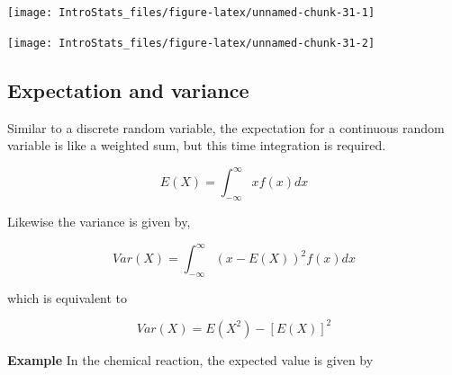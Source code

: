 \documentclass[
  oneside]{krantz}
\newenvironment{Shaded}{\begin{snugshade}}{\end{snugshade}}
\newcommand{\AttributeTok}[1]{\textcolor[rgb]{0.77,0.63,0.00}{#1}}
\newcommand{\CommentTok}[1]{\textcolor[rgb]{0.56,0.35,0.01}{\textit{#1}}}
\newcommand{\DecValTok}[1]{\textcolor[rgb]{0.00,0.00,0.81}{#1}}
\newcommand{\FunctionTok}[1]{\textcolor[rgb]{0.00,0.00,0.00}{#1}}
\newcommand{\NormalTok}[1]{#1}
\newcommand{\OtherTok}[1]{\textcolor[rgb]{0.56,0.35,0.01}{#1}}
\newcommand{\SpecialCharTok}[1]{\textcolor[rgb]{0.00,0.00,0.00}{#1}}
\newcommand{\StringTok}[1]{\textcolor[rgb]{0.31,0.60,0.02}{#1}}
\begin{document}
\begin{center}\texttt{[image: IntroStats\_files/figure-latex/unnamed-chunk-31-1]} \end{center}

\begin{Shaded}
\end{Shaded}

\begin{center}\texttt{[image: IntroStats\_files/figure-latex/unnamed-chunk-31-2]} \end{center}

\hypertarget{expectation-and-variance-1}{%
\subsection{Expectation and variance}\label{expectation-and-variance-1}}

Similar to a discrete random variable, the expectation for a continuous random variable is like a weighted sum, but this time integration is required.

\begin{equation}
E(X) = \int_{-\infty}^{\infty}xf(x)dx
\end{equation}

Likewise the variance is given by,

\begin{equation}
Var(X) = \int_{-\infty}^{\infty}(x - E(X))^2f(x)dx
\end{equation}

which is equivalent to

\begin{equation}
Var(X) = E(X^2) - [E(X)]^2
\end{equation}

\textbf{Example} In the chemical reaction, the expected value is given by
\end{document}
